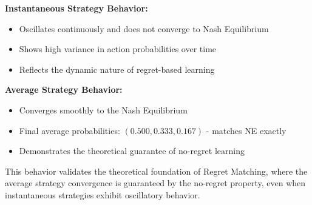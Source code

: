 \documentclass[conference]{IEEEtran}
\begin{document}
\textbf{Instantaneous Strategy Behavior:}
\begin{itemize}
    \item Oscillates continuously and does not converge to Nash Equilibrium
    \item Shows high variance in action probabilities over time
    \item Reflects the dynamic nature of regret-based learning
\end{itemize}

\textbf{Average Strategy Behavior:}
\begin{itemize}
    \item Converges smoothly to the Nash Equilibrium
    \item Final average probabilities: $(0.500, 0.333, 0.167)$ - matches NE exactly
    \item Demonstrates the theoretical guarantee of no-regret learning
\end{itemize}

This behavior validates the theoretical foundation of Regret Matching, where the average strategy convergence is guaranteed by the no-regret property, even when instantaneous strategies exhibit oscillatory behavior.


\newpage
\end{document}
